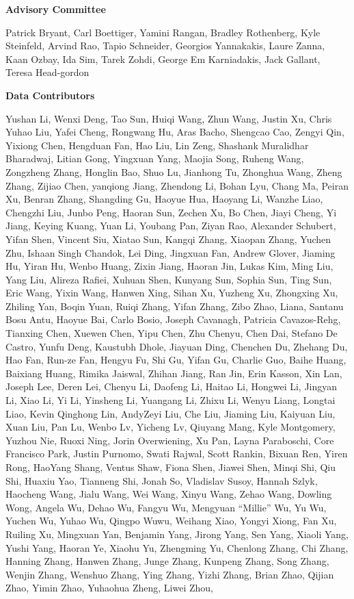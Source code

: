 \documentclass{llmxive}
\begin{document}
{\normalsize\bfseries Advisory Committee}\par\vspace{4pt}
Patrick Bryant, Carl Boettiger, Yamini Rangan, Bradley Rothenberg, Kyle Steinfeld, Arvind Rao, Tapio Schneider, Georgios Yannakakis, Laure Zanna, Kaan Ozbay, Ida Sim, Tarek Zohdi, George Em Karniadakis, Jack Gallant, Teresa Head-gordon\par
\vspace{16pt}

{\normalsize\bfseries Data Contributors}\par\vspace{4pt}
{\footnotesize
Yushan Li, Wenxi Deng, Tao Sun, Huiqi Wang, Zhun Wang, Justin Xu, Chris Yuhao Liu, Yafei Cheng, Rongwang Hu, Aras Bacho, Shengcao Cao, Zengyi Qin, Yixiong Chen, Hengduan Fan, Hao Liu, Lin Zeng, Shashank Muralidhar Bharadwaj, Litian Gong, Yingxuan Yang, Maojia Song, Ruheng Wang, Zongzheng Zhang, Honglin Bao, Shuo Lu, Jianhong Tu, Zhonghua Wang, Zheng Zhang, Zijiao Chen, yanqiong Jiang, Zhendong Li, Bohan Lyu, Chang Ma, Peiran Xu, Benran Zhang, Shangding Gu, Haoyue Hua, Haoyang Li, Wanzhe Liao, Chengzhi Liu, Junbo Peng, Haoran Sun, Zechen Xu, Bo Chen, Jiayi Cheng, Yi Jiang, Keying Kuang, Yuan Li, Youbang Pan, Ziyan Rao, Alexander Schubert, Yifan Shen, Vincent Siu, Xiatao Sun, Kangqi Zhang, Xiaopan Zhang, Yuchen Zhu, Ishaan Singh Chandok, Lei Ding, Jingxuan Fan, Andrew Glover, Jiaming Hu, Yiran Hu, Wenbo Huang, Zixin Jiang, Haoran Jin, Lukas Kim, Ming Liu, Yang Liu, Alireza Rafiei, Xuhuan Shen, Kunyang Sun, Sophia Sun, Ting Sun, Eric Wang, Yixin Wang, Hanwen Xing, Sihan Xu, Yuzheng Xu, Zhongxing Xu, Zhiling Yan, Boqin Yuan, Ruiqi Zhang, Yifan Zhang, Zibo Zhao, Liana, Santanu Bosu Antu, Haoyue Bai, Carlo Bosio, Joseph Cavanagh, Patricia Cavazos-Rehg, Tianxing Chen, Xuewen Chen, Yipu Chen, Zhu Chenyu, Chen Dai, Stefano De Castro, Yunfu Deng, Kaustubh Dhole, Jiayuan Ding, Chenchen Du, Zhehang Du, Hao Fan, Run-ze Fan, Hengyu Fu, Shi Gu, Yifan Gu, Charlie Guo, Baihe Huang, Baixiang Huang, Rimika Jaiswal, Zhihan Jiang, Ran Jin, Erin Kasson, Xin Lan, Joseph Lee, Deren Lei, Chenyu Li, Daofeng Li, Haitao Li, Hongwei Li, Jingyan Li, Xiao Li, Yi Li, Yinsheng Li, Yuangang Li, Zhixu Li, Wenyu Liang, Longtai Liao, Kevin Qinghong Lin, AndyZeyi Liu, Che Liu, Jiaming Liu, Kaiyuan Liu, Xuan Liu, Pan Lu, Wenbo Lv, Yicheng Lv, Qiuyang Mang, Kyle Montgomery, Yuzhou Nie, Ruoxi Ning, Jorin Overwiening, Xu Pan, Layna Paraboschi, Core Francisco Park, Justin Purnomo, Swati Rajwal, Scott Rankin, Bixuan Ren, Yiren Rong, HaoYang Shang, Ventus Shaw, Fiona Shen, Jiawei Shen, Minqi Shi, Qiu Shi, Huaxiu Yao, Tianneng Shi, Jonah So, Vladislav Susoy, Hannah Szlyk, Haocheng Wang, Jialu Wang, Wei Wang, Xinyu Wang, Zehao Wang, Dowling Wong, Angela Wu, Dehao Wu, Fangyu Wu, Mengyuan ``Millie'' Wu, Yu Wu, Yuchen Wu, Yuhao Wu, Qingpo Wuwu, Weihang Xiao, Yongyi Xiong, Fan Xu, Ruiling Xu, Mingxuan Yan, Benjamin Yang, Jirong Yang, Sen Yang, Xiaoli Yang, Yushi Yang, Haoran Ye, Xiaohu Yu, Zhengming Yu, Chenlong Zhang, Chi Zhang, Hanning Zhang, Hanwen Zhang, Junge Zhang, Kunpeng Zhang, Song Zhang, Wenjin Zhang, Wenshuo Zhang, Ying Zhang, Yizhi Zhang, Brian Zhao, Qijian Zhao, Yimin Zhao, Yuhaohua Zheng, Liwei Zhou, }
\end{document}
